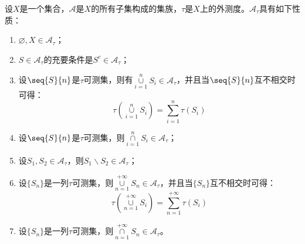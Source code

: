 \begin{property}\label{prop:tauMeasurableSetCollection}
	设$X$是一个集合，$\mathscr{A}$是$X$的所有子集构成的集族，$\tau$是$X$上的外测度。$\mathscr{A}_{\tau}$具有如下性质：
	\begin{enumerate}
		\item $\varnothing,X\in \mathscr{A}_{\tau}$； 
		\item $S\in \mathscr{A}_{\tau}$的充要条件是$S^c\in \mathscr{A}_{\tau}$；
		\item 设$\seq{S}{n}$是$\tau$可测集，则有$\underset{i=1}{\overset{n}{\cup}}S_i\in \mathscr{A}_{\tau}$，并且当$\seq{S}{n}$互不相交时可得：
		\begin{equation*}
			\tau\left(\underset{i=1}{\overset{n}{\cup}}S_i\right)=\sum_{i=1}^{n}\tau(S_i)
		\end{equation*}
		\item 设$\seq{S}{n}$是$\tau$可测集，则$\underset{i=1}{\overset{n}{\cap}}S_i\in \mathscr{A}_{\tau}$；
		\item 设$S_1,S_2\in \mathscr{A}_{\tau}$，则$S_1\backslash S_2\in \mathscr{A}_{\tau}$；
		\item 设$\{S_n\}$是一列$\tau$可测集，则$\underset{n=1}{\overset{+\infty}{\cup}}S_n\in \mathscr{A}_{\tau}$，并且当$\{S_n\}$互不相交时可得：
		\begin{equation*}
			\tau\left(\underset{n=1}{\overset{+\infty}{\cup}}S_i\right)=\sum_{n=1}^{+\infty}\tau(S_i)
		\end{equation*}
		\item 设$\{S_n\}$是一列$\tau$可测集，则$\underset{n=1}{\overset{+\infty}{\cap}}S_n\in\mathscr{A}_{\tau}$。
	\end{enumerate}
\end{property}
